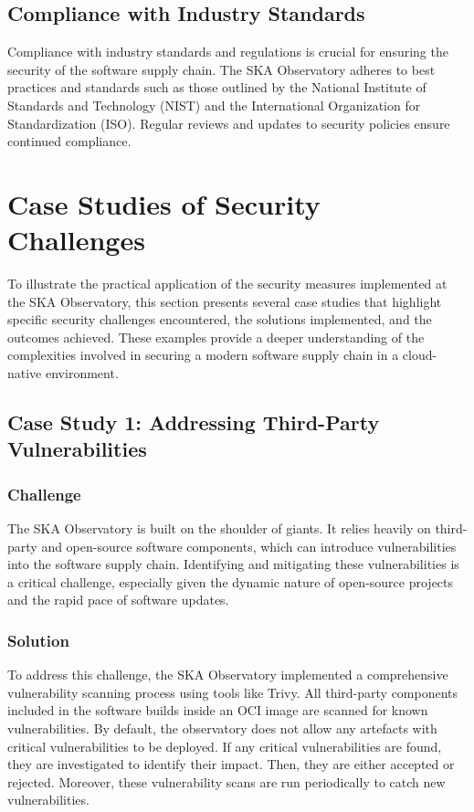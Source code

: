 \documentclass[a4paper]{spie}  %
\begin{document}
\subsection{Compliance with Industry Standards}

Compliance with industry standards and regulations is crucial for ensuring the security of the software supply chain. The SKA Observatory adheres to best practices and standards such as those outlined by the National Institute of Standards and Technology (NIST) and the International Organization for Standardization (ISO). Regular reviews and updates to security policies ensure continued compliance.

\section{Case Studies of Security Challenges}

To illustrate the practical application of the security measures implemented at the SKA Observatory, this section presents several case studies that highlight specific security challenges encountered, the solutions implemented, and the outcomes achieved. These examples provide a deeper understanding of the complexities involved in securing a modern software supply chain in a cloud-native environment.

\subsection{Case Study 1: Addressing Third-Party Vulnerabilities}

\subsubsection{Challenge}

The SKA Observatory is built on the shoulder of giants. It relies heavily on third-party and open-source software components, which can introduce vulnerabilities into the software supply chain. Identifying and mitigating these vulnerabilities is a critical challenge, especially given the dynamic nature of open-source projects and the rapid pace of software updates.

\subsubsection{Solution}

To address this challenge, the SKA Observatory implemented a comprehensive vulnerability scanning process using tools like Trivy\cite{TrivyHome}. All third-party components included in the software builds inside an OCI image are scanned for known vulnerabilities. By default, the observatory does not allow any artefacts with critical vulnerabilities to be deployed. If any critical vulnerabilities are found, they are investigated to identify their impact. Then, they are either accepted or rejected. Moreover, these vulnerability scans are run periodically to catch new vulnerabilities.
\end{document}
